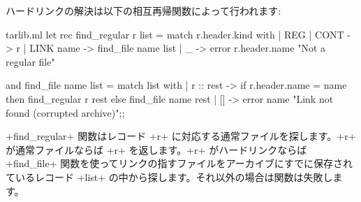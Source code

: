 ハードリンクの解決は以下の相互再帰関数によって行われます:
\begin{listingcodefile}{tarlib.ml}
let rec find_regular r list = match r.header.kind with
  | REG | CONT -> r
  | LINK name -> find_file name list
  | _ -> error r.header.name "Not a regular file"

and find_file name list = match list with
  | r :: rest ->
      if r.header.name = name then find_regular r rest
      else find_file name rest
  | [] -> error name "Link not found (corrupted archive)";;
\end{listingcodefile}
\ml+find_regular+ 関数はレコード \ml+r+ に対応する通常ファイルを探します。\ml+r+ が通常ファイルならば \ml+r+ を返します。\ml+r+ がハードリンクならば \ml+find_file+ 関数を使ってリンクの指すファイルをアーカイブにすでに保存されているレコード \ml+list+ の中から探します。それ以外の場合は関数は失敗します。

